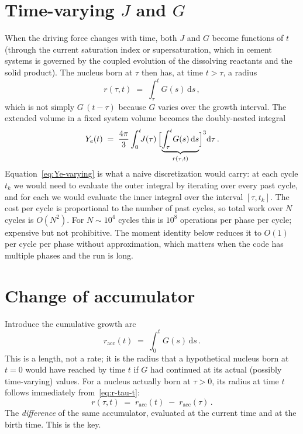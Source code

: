 \documentclass[11pt]{article}
\begin{document}
\section{Time-varying $J$ and $G$}

When the driving force changes with time, both $J$ and $G$ become
functions of $t$ (through the current saturation index or
supersaturation, which in cement systems is governed by the coupled
evolution of the dissolving reactants and the solid product).
The nucleus born at $\tau$ then has, at time $t > \tau$, a radius
\begin{equation}
r(\tau, t) \;=\; \int_{\tau}^{t} G(s)\, \mathrm{d}s\,,
\label{eq:r-tau-t}
\end{equation}
which is not simply $G\,(t-\tau)$ because $G$ varies over the growth
interval.
The extended volume in a fixed system volume becomes the doubly-nested
integral
\begin{equation}
Y_e(t) \;=\; \frac{4\pi}{3}\int_{0}^{t}\!\! J(\tau)\,
    \Bigl[\underbrace{\int_{\tau}^{t}\! G(s)\, \mathrm{d}s}_{r(\tau, t)}\Bigr]^{3}
    \mathrm{d}\tau\,.
\label{eq:Ye-varying}
\end{equation}
Equation~\eqref{eq:Ye-varying} is what a naive discretization would
carry: at each cycle $t_k$ we would need to evaluate the outer
integral by iterating over every past cycle, and for each we would
evaluate the inner integral over the interval $[\tau, t_k]$.
The cost per cycle is proportional to the number of past cycles, so
total work over $N$ cycles is $O(N^2)$.
For $N \sim 10^4$ cycles this is $10^8$ operations per phase per
cycle; expensive but not prohibitive.
The moment identity below reduces it to $O(1)$ per cycle per phase
without approximation, which matters when the code has multiple
phases and the run is long.

\section{Change of accumulator}

Introduce the cumulative growth arc
\begin{equation}
r_{\text{acc}}(t) \;=\; \int_{0}^{t}\! G(s)\, \mathrm{d}s\,.
\label{eq:racc-def}
\end{equation}
This is a length, not a rate; it is the radius that a hypothetical
nucleus born at $t = 0$ would have reached by time $t$
if $G$ had continued at its actual (possibly time-varying) values.
For a nucleus actually born at $\tau > 0$, its radius at time $t$
follows immediately from~\eqref{eq:r-tau-t}:
\begin{equation}
r(\tau, t) \;=\; r_{\text{acc}}(t) \;-\; r_{\text{acc}}(\tau)\,.
\label{eq:r-tau-t-diff}
\end{equation}
The \emph{difference} of the same accumulator, evaluated at the
current time and at the birth time.
This is the key.
\end{document}
